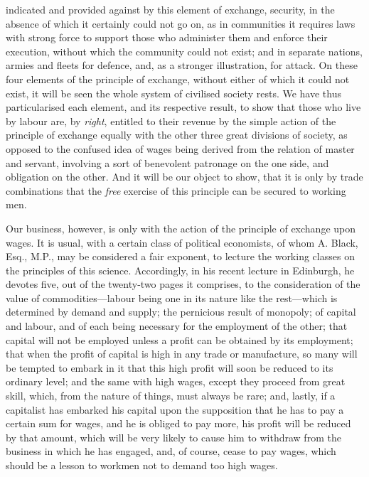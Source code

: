\documentclass[12pt, a4paper]{book}
\begin{document}
    indicated and provided against by this element of exchange,
    security, in the absence of which it certainly could not go on, as
    in communities it requires laws with strong force to support those
    who administer them and enforce their execution, without which the
    community could not exist; and in separate nations, armies and
    fleets for defence, and, as a stronger illustration, for attack. On
    these four elements of the principle of exchange, without either of
    which it could not exist, it will be seen the whole system of
    civilised society rests. We have thus particularised each element,
    and its respective result, to show that those who live by labour
    are, by \textit{right}, entitled to their revenue by the simple
    action of the principle of exchange equally with the other three
    great divisions of society, as opposed to the confused idea of wages
    being derived from the relation of master and servant, involving a
    sort of benevolent patronage on the one side, and obligation on the
    other. And it will be our object to show, that it is only by trade
    combinations that the \textit{free} exercise of this principle can
    be secured to working men.

    Our business, however, is only with the action of the principle of
    exchange upon wages. It is usual, with a certain class of political
    economists, of whom A. Black, Esq., M.P., may be considered a fair
    exponent, to lecture the working classes on the principles of this
    science. Accordingly, in his recent lecture in Edinburgh, he devotes
    five, out of the twenty-two pages it comprises, to the consideration
    of the value of commodities---labour being one in its nature like
    the rest---which is determined by demand and supply; the pernicious
    result of monopoly; of capital and labour, and of each being
    necessary for the employment of the other; that capital will not be
    employed unless a profit can be obtained by its employment; that
    when the profit of capital is high in any trade or manufacture, so
    many will be tempted to embark in it that this high profit will soon
    be reduced to its ordinary level; and the same with high wages,
    except they proceed from great skill, which, from the nature of
    things, must always be rare; and, lastly, if a capitalist has
    embarked his capital upon the supposition that he has to pay a
    certain sum for wages, and he is obliged to pay more, his profit
    will be reduced by that amount, which will be very likely to cause
    him to withdraw from the business in which he has engaged, and, of
    course, cease to pay wages, which should be a lesson to workmen not
    to demand too high wages.
\end{document}
